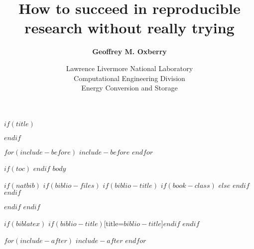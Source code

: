 \documentclass [11pt]{beamer}
\title[Reproducibility without trying]
{How to succeed in reproducible research without really trying}
\subtitle[G. Oxberry]
{\textbf{Geoffrey M. Oxberry}}
\author[]{\small{Lawrence Livermore National Laboratory \\
Computational Engineering Division \\
Energy Conversion and Storage}}
\institute[LLNL-PRES-XXXXX-DRAFT]
\begin{document}
$if(title)$
\maketitle
$endif$ %

$for(include-before)$
$include-before$
$endfor$ %

$if(toc)$
{
\hypersetup{linkcolor=black}
\setcounter{tocdepth}{$toc-depth$}
\tableofcontents
}
$endif$ %
$body$

$if(natbib)$
$if(biblio-files)$
$if(biblio-title)$
$if(book-class)$
\renewcommand\bibname{$biblio-title$}
$else$
\renewcommand\refname{$biblio-title$}
$endif$ %
$endif$ %

$endif$ %
$endif$ %

$if(biblatex)$
\printbibliography$if(biblio-title)$[title=$biblio-title$]$endif$
$endif$ %

$for(include-after)$
$include-after$
$endfor$ %
\end{document}
